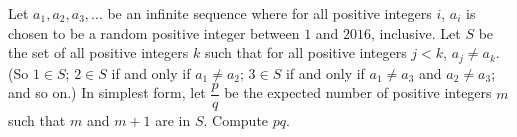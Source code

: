 Let $a_1,a_2,a_3,\ldots$ be an infinite sequence where for all positive integers $i$, $a_i$ is chosen to be a random positive integer between $1$ and $2016$, inclusive. Let $S$ be the set of all positive integers $k$ such that for all positive integers $j<k$, $a_j\neq a_k$. (So $1\in S$; $2\in S$ if and only if $a_1\neq a_2$; $3\in S$ if and only if $a_1\neq a_3$ and $a_2\neq a_3$; and so on.) In simplest form, let $\dfrac{p}{q}$ be the expected number of positive integers $m$ such that $m$ and $m+1$ are in $S$. Compute $pq$.